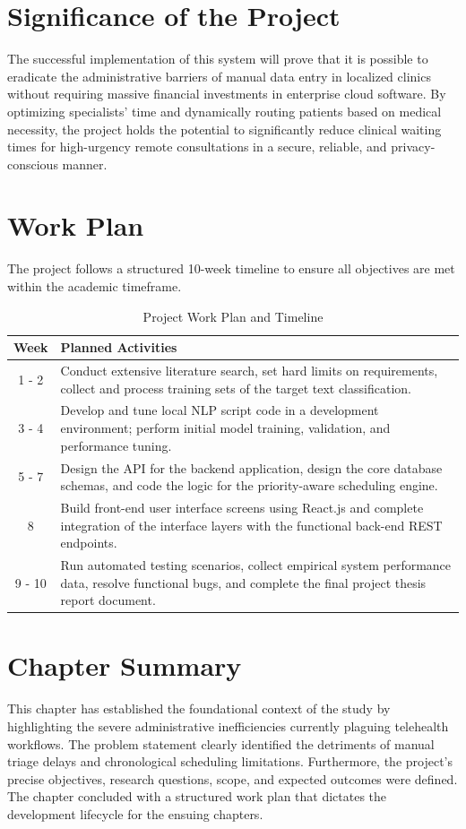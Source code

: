 \documentclass[12pt,a4paper]{report}
\begin{document}
\section{Significance of the Project}
The successful implementation of this system will prove that it is possible to eradicate the administrative barriers of manual data entry in localized clinics without requiring massive financial investments in enterprise cloud software. By optimizing specialists' time and dynamically routing patients based on medical necessity, the project holds the potential to significantly reduce clinical waiting times for high-urgency remote consultations in a secure, reliable, and privacy-conscious manner.

\section{Work Plan}
The project follows a structured 10-week timeline to ensure all objectives are met within the academic timeframe.

\begin{table}[H]
\centering
\caption{Project Work Plan and Timeline}
\begin{tabularx}{\textwidth}{|c|X|}
\hline
\textbf{Week} & \textbf{Planned Activities} \\ \hline
1 - 2 & Conduct extensive literature search, set hard limits on requirements, collect and process training sets of the target text classification. \\ \hline
3 - 4 & Develop and tune local NLP script code in a development environment; perform initial model training, validation, and performance tuning. \\ \hline
5 - 7 & Design the API for the backend application, design the core database schemas, and code the logic for the priority-aware scheduling engine. \\ \hline
8 & Build front-end user interface screens using React.js and complete integration of the interface layers with the functional back-end REST endpoints. \\ \hline
9 - 10 & Run automated testing scenarios, collect empirical system performance data, resolve functional bugs, and complete the final project thesis report document. \\ \hline
\end{tabularx}
\end{table}

\section{Chapter Summary}
This chapter has established the foundational context of the study by highlighting the severe administrative inefficiencies currently plaguing telehealth workflows. The problem statement clearly identified the detriments of manual triage delays and chronological scheduling limitations. Furthermore, the project's precise objectives, research questions, scope, and expected outcomes were defined. The chapter concluded with a structured work plan that dictates the development lifecycle for the ensuing chapters.
\end{document}
